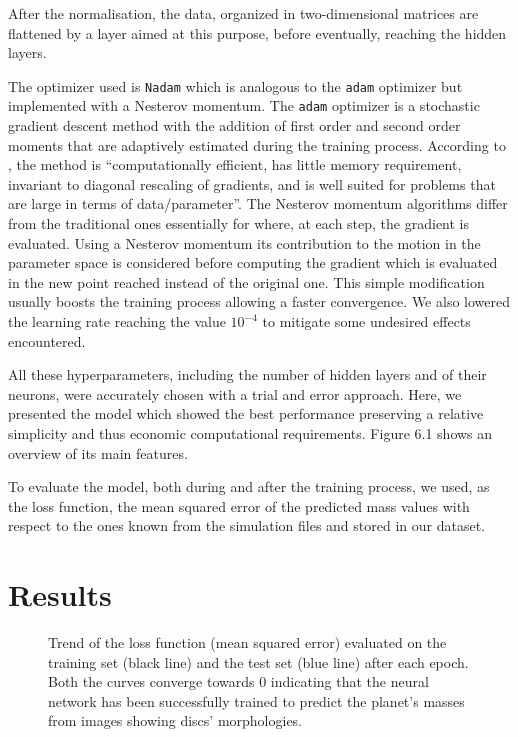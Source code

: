 \documentclass[a4paper,10pt]{report}
\begin{document}
After the normalisation, the data, organized in two-dimensional matrices are flattened by a layer aimed at this purpose, before
eventually, reaching the hidden layers.

The optimizer used is \lstinline{Nadam} which is analogous to the \lstinline{adam} optimizer but implemented with a Nesterov momentum.
The \lstinline{adam} optimizer is a stochastic gradient descent method with the addition of first order and second order moments
that are adaptively estimated during the training process. According to
 \citet{nadam},
 the method is ``computationally efficient, has little memory requirement, 
 invariant to diagonal rescaling of gradients, 
 and is well suited for problems that are large in terms of data/parameter''.
The Nesterov momentum algorithms differ from the traditional ones essentially for where, at each step, the gradient is evaluated.
Using a Nesterov momentum its contribution to the motion in the parameter space is considered before computing the gradient 
which is evaluated in the new point reached instead of the original one. This simple modification usually boosts the training process allowing
a faster convergence.
We also lowered the learning rate reaching the value $10^{-4}$ to mitigate some undesired effects encountered.

All these hyperparameters, including the number of hidden layers and of their neurons, were accurately chosen
with a trial and error approach. Here, we presented the model which showed the best performance preserving a relative simplicity
and thus economic computational requirements. 
Figure 6.1 shows an overview of its main features.

To evaluate the model, both during and after the training process, we used, as the loss function, the mean squared error of the predicted mass values 
with respect to the ones known from the simulation files and stored in our dataset.

\section{Results}

\begin{figure}
    \begin{center}
        
    \end{center}
    \caption{Trend of the loss function (mean squared error) 
    evaluated on the training set (black line) and the test set (blue line)
    after each epoch. Both the curves converge towards 0
    indicating that the neural network has been successfully trained to predict the planet's masses 
    from images showing discs' morphologies. }
\end{figure}
\end{document}
